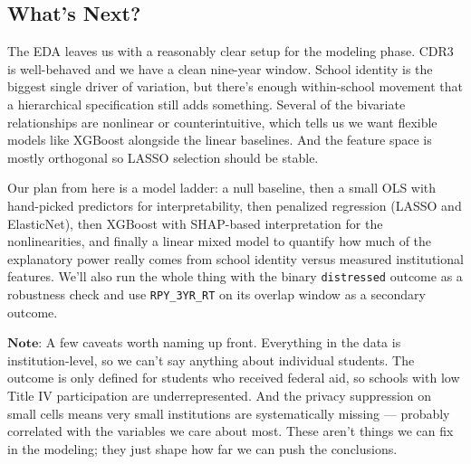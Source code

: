 \documentclass[
]{article}
\begin{document}
\subsection{What's Next?}\label{whats-next}

The EDA leaves us with a reasonably clear setup for the modeling phase.
CDR3 is well-behaved and we have a clean nine-year window. School
identity is the biggest single driver of variation, but there's enough
within-school movement that a hierarchical specification still adds
something. Several of the bivariate relationships are nonlinear or
counterintuitive, which tells us we want flexible models like XGBoost
alongside the linear baselines. And the feature space is mostly
orthogonal so LASSO selection should be stable.

Our plan from here is a model ladder: a null baseline, then a small OLS
with hand-picked predictors for interpretability, then penalized
regression (LASSO and ElasticNet), then XGBoost with SHAP-based
interpretation for the nonlinearities, and finally a linear mixed model
to quantify how much of the explanatory power really comes from school
identity versus measured institutional features. We'll also run the
whole thing with the binary \texttt{distressed} outcome as a robustness
check and use \texttt{RPY\_3YR\_RT} on its overlap window as a secondary
outcome.

\(\textbf{Note:}\) A few caveats worth naming up front. Everything in
the data is institution-level, so we can't say anything about individual
students. The outcome is only defined for students who received federal
aid, so schools with low Title IV participation are underrepresented.
And the privacy suppression on small cells means very small institutions
are systematically missing --- probably correlated with the variables we
care about most. These aren't things we can fix in the modeling; they
just shape how far we can push the conclusions.
\end{document}
